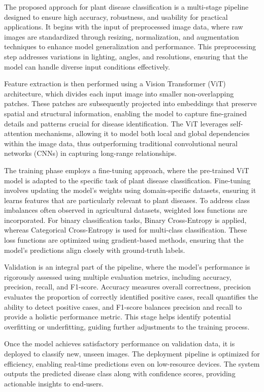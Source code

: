 The proposed approach for plant disease classification is a multi-stage pipeline designed to ensure high accuracy, robustness, and usability for practical applications. It begins with the input of preprocessed image data, where raw images are standardized through resizing, normalization, and augmentation techniques to enhance model generalization and performance. This preprocessing step addresses variations in lighting, angles, and resolutions, ensuring that the model can handle diverse input conditions effectively.  

Feature extraction is then performed using a Vision Transformer (ViT) architecture, which divides each input image into smaller non-overlapping patches. These patches are subsequently projected into embeddings that preserve spatial and structural information, enabling the model to capture fine-grained details and patterns crucial for disease identification. The ViT leverages self-attention mechanisms, allowing it to model both local and global dependencies within the image data, thus outperforming traditional convolutional neural networks (CNNs) in capturing long-range relationships.  

The training phase employs a fine-tuning approach, where the pre-trained ViT model is adapted to the specific task of plant disease classification. Fine-tuning involves updating the model’s weights using domain-specific datasets, ensuring it learns features that are particularly relevant to plant diseases. To address class imbalances often observed in agricultural datasets, weighted loss functions are incorporated. For binary classification tasks, Binary Cross-Entropy is applied, whereas Categorical Cross-Entropy is used for multi-class classification. These loss functions are optimized using gradient-based methods, ensuring that the model’s predictions align closely with ground-truth labels.  

Validation is an integral part of the pipeline, where the model’s performance is rigorously assessed using multiple evaluation metrics, including accuracy, precision, recall, and F1-score. Accuracy measures overall correctness, precision evaluates the proportion of correctly identified positive cases, recall quantifies the ability to detect positive cases, and F1-score balances precision and recall to provide a holistic performance metric. This stage helps identify potential overfitting or underfitting, guiding further adjustments to the training process.  

Once the model achieves satisfactory performance on validation data, it is deployed to classify new, unseen images. The deployment pipeline is optimized for efficiency, enabling real-time predictions even on low-resource devices. The system outputs the predicted disease class along with confidence scores, providing actionable insights to end-users.  

